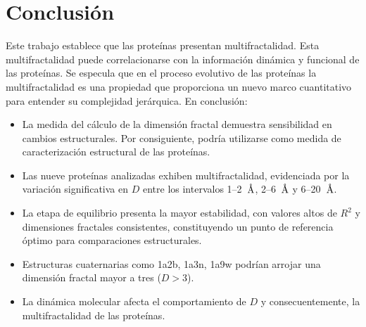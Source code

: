 \chapter{Conclusión}


	 \color{blue}
Este trabajo establece que las proteínas presentan multifractalidad. Esta multifractalidad puede correlacionarse con la información dinámica y funcional de las proteínas. Se especula que en el proceso evolutivo de las prote\'{i}nas la multifractalidad es una propiedad que proporciona un nuevo marco cuantitativo para entender su complejidad jer\'{a}rquica. En conclusión:


\begin{itemize}
	\item La medida del c\'{a}lculo de la dimensi\'{o}n fractal demuestra sensibilidad en
	 cambios estructurales. Por consiguiente, podr\'{i}a utilizarse como medida de caracterizaci\'{o}n 
	 estructural de las prote\'{i}nas.
	
	\item Las nueve prote\'{i}nas analizadas exhiben multifractalidad, evidenciada por la variaci\'{o}n 
	significativa en $D$ entre los intervalos 1--2~$\textup{\r{A}}$, 2--6~$\textup{\r{A}}$ y 6--20~$\textup{\r{A}}$.
	
	\item La etapa de equilibrio presenta la mayor estabilidad, con valores altos de $R^2$ y 
	dimensiones fractales consistentes, constituyendo un punto de referencia \'{o}ptimo para comparaciones estructurales.
	
	\item Estructuras cuaternarias como 1a2b, 1a3n, 1a9w podr\'{i}an arrojar una dimensi\'{o}n fractal mayor a tres ($D>3$).
	
	
	\item La din\'{a}mica molecular afecta el comportamiento de $D$ y consecuentemente, la multifractalidad de las prote\'{i}nas.
\end{itemize}
